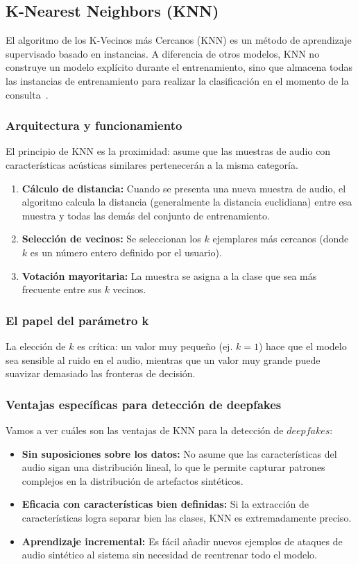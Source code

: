 \subsection{K-Nearest Neighbors (KNN)}
\label{subsubsec:eda_knn}

El algoritmo de los K-Vecinos más Cercanos (KNN) es un método de aprendizaje supervisado basado en instancias. A diferencia de otros modelos, KNN no construye un modelo explícito durante el entrenamiento, sino que almacena todas las instancias de entrenamiento para realizar la clasificación en el momento de la consulta~\parencite{Lu2023}.

\subsubsection*{Arquitectura y funcionamiento}
El principio de KNN es la proximidad: asume que las muestras de audio con características acústicas similares pertenecerán a la misma categoría.
\begin{enumerate}
    \item \textbf{Cálculo de distancia:} Cuando se presenta una nueva muestra de audio, el algoritmo calcula la distancia (generalmente la distancia euclidiana) entre esa muestra y todas las demás del conjunto de entrenamiento.
    \item \textbf{Selección de vecinos:} Se seleccionan los $k$ ejemplares más cercanos (donde $k$ es un número entero definido por el usuario).
    \item \textbf{Votación mayoritaria:} La muestra se asigna a la clase que sea más frecuente entre sus $k$ vecinos.
\end{enumerate}

\subsubsection*{El papel del parámetro k}
La elección de $k$ es crítica: un valor muy pequeño (ej. $k=1$) hace que el modelo sea sensible al ruido en el audio, mientras que un valor muy grande puede suavizar demasiado las fronteras de decisión.

\subsubsection*{Ventajas específicas para detección de deepfakes}

Vamos a ver cuáles son las ventajas de KNN para la detección de $deepfakes$:

\begin{itemize}
    \item \textbf{Sin suposiciones sobre los datos:} No asume que las características del audio sigan una distribución lineal, lo que le permite capturar patrones complejos en la distribución de artefactos sintéticos.
    \item \textbf{Eficacia con características bien definidas:} Si la extracción de características logra separar bien las clases, KNN es extremadamente preciso.
    \item \textbf{Aprendizaje incremental:} Es fácil añadir nuevos ejemplos de ataques de audio sintético al sistema sin necesidad de reentrenar todo el modelo.
\end{itemize}